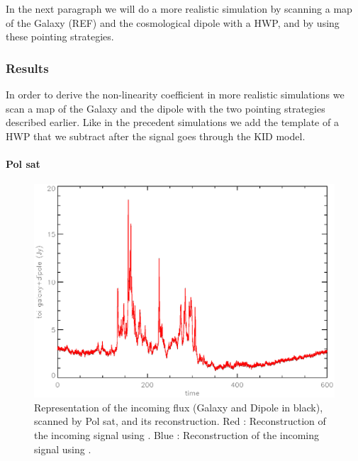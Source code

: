 In the next paragraph we will do a more realistic simulation by scanning a map of the Galaxy (REF) and the cosmological dipole with a HWP, and by using these pointing strategies. 

\subsubsection{Results}

In order to derive the non-linearity coefficient in more realistic simulations we scan a map of the Galaxy and the dipole with the two pointing strategies described earlier. Like in the precedent simulations we add the template of a HWP that we subtract after the signal goes through the KID model.

\paragraph{Pol sat \\}

\begin{figure}[h]
\center
	\includegraphics[scale=0.5]{Figures/toi-galaxy-dipole.eps}
	\caption{Representation of the incoming flux (Galaxy and Dipole in black), scanned by Pol sat, and its reconstruction. Red : Reconstruction of the incoming signal using \cf. Blue : Reconstruction of the incoming signal using \rf.
}
	\label{fig:toi-galaxy-dipole-pol}
\end{figure}

